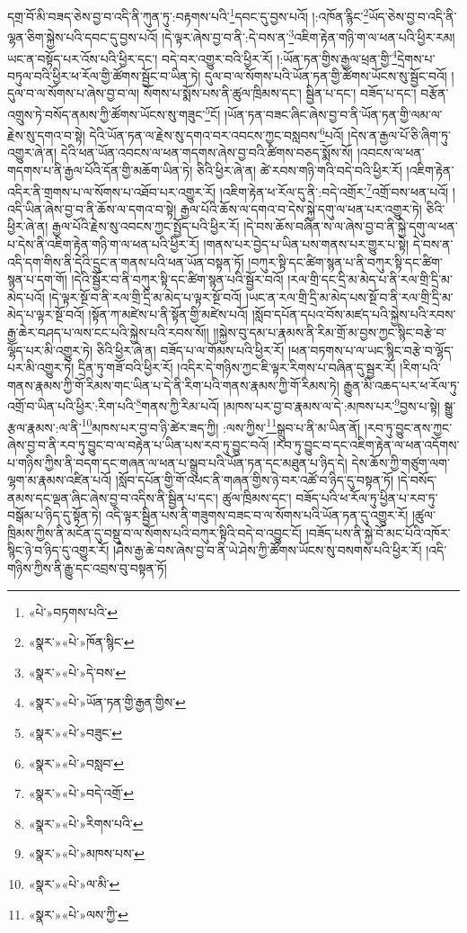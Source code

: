 དགྲ་བོ་མི་བཟད་ཅེས་བྱ་བ་འདི་ནི་ཀུན་ཏུ་:བརྟགས་པའི་\footnote{«པེ་»བཏགས་པའི་}དབང་དུ་བྱས་པའོ། །:འཁོན་རྙིང་\footnote{«སྣར་»«པེ་»ཁོན་སྙིང་}ཡོད་ཅེས་བྱ་བ་འདི་ནི་ལྷན་ཅིག་སྐྱེས་པའི་དབང་དུ་བྱས་པའོ། །དེ་ལྟར་ཞེས་བྱ་བ་ནི་:དེ་བས་ན་\footnote{«སྣར་»«པེ་»དེ་བས་}འཇིག་རྟེན་གཉི་ག་ལ་ཕན་པའི་ཕྱིར་རམ། ཡང་ན་བསྟོད་པར་འོས་པའི་ཕྱིར་དང་། བདེ་བར་འགྱུར་བའི་ཕྱིར་རོ། །:ཡོན་ཏན་གྱིས་རྒྱལ་ཕྲན་གྱི་\footnote{«སྣར་»«པེ་»ཡོན་ཏན་གྱི་རྒྱན་གྱིས་}དྲེགས་པ་བཏུལ་བའི་ཕྱིར་ཕ་རོལ་གྱི་ཚོགས་སྦྱོང་བ་ཡིན་ཏེ། དུལ་བ་ལ་སོགས་པའི་ཡོན་ཏན་གྱི་ཚོགས་ཡོངས་སུ་སྦྱོང་བའོ། །དུལ་བ་ལ་སོགས་པ་ཞེས་བྱ་བ་ལ། སོགས་པ་སྨོས་པས་ནི་ཚུལ་ཁྲིམས་དང་། སྦྱིན་པ་དང་། བཟོད་པ་དང་། བརྩོན་འགྲུས་ཏེ་བསོད་ནམས་ཀྱི་ཚོགས་ཡོངས་སུ་གཟུང་\footnote{«སྣར་»«པེ་»བཟུང་}ངོ། །ཡོན་ཏན་བཟང་ཞིང་ཞེས་བྱ་བ་ནི་ཡོན་ཏན་གྱི་ལམ་ལ་རྗེས་སུ་དགའ་བ་སྟེ། དེའི་ཡོན་ཏན་ལ་རྗེས་སུ་དགའ་བར་འབངས་ཀྱང་བསླབས་\footnote{«སྣར་»«པེ་»བསླབ་}པའོ། །དེས་ན་རྒྱལ་པོ་ཅི་ཞིག་ཏུ་འགྱུར་ཞེ་ན། དེའི་ཕན་ཡོན་འབངས་ལ་ཕན་གདགས་ཞེས་བྱ་བའི་ཚིགས་བཅད་སྨོས་སོ། །འབངས་ལ་ཕན་གདགས་པ་ནི་རྒྱལ་པོའི་དོན་གྱི་མཆོག་ཡིན་ཏེ། ཅིའི་ཕྱིར་ཞེ་ན། ཚེ་རབས་གཉི་གའི་བདེ་བའི་ཕྱིར་རོ། །འཇིག་རྟེན་འདིར་ནི་གྲགས་པ་ལ་སོགས་པ་འཐོབ་པར་འགྱུར་རོ། །འཇིག་རྟེན་ཕ་རོལ་དུ་ནི་:བདེ་འགྲོར་\footnote{«སྣར་»«པེ་»བདེ་འགྲོ་}འགྲོ་བས་ཕན་པའོ། །འདི་ཡིན་ཞེས་བྱ་བ་ནི་ཆོས་ལ་དགའ་བ་སྟེ། རྒྱལ་པོའི་ཆོས་ལ་དགའ་བ་དེས་སྐྱེ་དགུ་ལ་ཕན་པར་འགྱུར་ཏེ། ཅིའི་ཕྱིར་ཞེ་ན། རྒྱལ་པོའི་རྗེས་སུ་འབངས་ཀྱང་སྤྱོད་པའི་ཕྱིར་རོ། །དེ་བས་ཆོས་བཞིན་ས་ལ་ཞེས་བྱ་བ་ནི་སྐྱེ་དགུ་ལ་ཕན་པ་དེས་ནི་འཇིག་རྟེན་གཉི་ག་ལ་ཕན་པའི་ཕྱིར་རོ། །གནས་པར་བྱེད་པ་ཡིན་པས་གནས་པར་གྱུར་པ་སྟེ། དེ་བས་ན་འདི་དག་གིས་ནི་དེའི་དྲུང་ན་གནས་པའི་ཕན་ཡོན་བསྟན་ཏོ། །བཀུར་སྟི་དང་ཚིག་སྙན་པ་ནི་བཀུར་སྟི་དང་ཚིག་སྙན་པ་དག་གོ། །དེའི་སྦྱོར་བ་ནི་བཀུར་སྟི་དང་ཚིག་སྙན་པའི་སྦྱོར་བའོ། །རལ་གྲི་དང་དྲི་མ་མེད་པ་ནི་རལ་གྲི་དྲི་མ་མེད་པའོ། །དེ་ལྟར་སྔོ་བ་ནི་རལ་གྲི་དྲི་མ་མེད་པ་ལྟར་སྔོ་བའོ། །ཡང་ན་རལ་གྲི་དྲི་མ་མེད་པས་སྔོ་བ་ནི་རལ་གྲི་དྲི་མ་མེད་པ་ལྟར་སྔོ་བའོ། །སྟོན་ཀ་མཛེས་པ་ནི་སྟོན་གྱི་མཛེས་པའོ། །སློབ་དཔོན་དཔའ་བོས་མཛད་པའི་སྐྱེས་པའི་རབས་རྒྱ་ཆེར་བཤད་པ་ལས་ངང་པའི་སྐྱེས་པའི་རབས་སོ།། །།སྐྱེས་བུ་དམ་པ་རྣམས་ནི་རིམ་གྲོ་མ་བྱས་ཀྱང་སྙིང་བརྩེ་བ་ལྷོད་པར་མི་འགྱུར་ཏེ། ཅིའི་ཕྱིར་ཞེ་ན། བཟོད་པ་ལ་གོམས་པའི་ཕྱིར་རོ། །ཕན་བཏགས་པ་ལ་ཡང་སྙིང་བརྩེ་བ་ལྷོད་པར་མི་འགྱུར་ཏེ། དྲིན་ཏུ་གཟོ་བའི་ཕྱིར་རོ། །འདིར་དེ་གཉིས་ཀྱང་ཇི་ལྟར་རིགས་པ་བཞིན་དུ་སྦྱར་རོ། །རིག་པའི་གནས་རྣམས་ཀྱི་གོ་རིམས་གང་ཡིན་པ་དེ་ནི་རིག་པའི་གནས་རྣམས་ཀྱི་གོ་རིམས་ཏེ། རྒྱུན་མི་འཆད་པར་ཕ་རོལ་ཏུ་འགྲོ་བ་ཡིན་པའི་ཕྱིར་:རིག་པའི་\footnote{«སྣར་»«པེ་»རིགས་པའི་}གནས་ཀྱི་རིམ་པའོ། །མཁས་པར་བྱ་བ་རྣམས་ལ་དེ་:མཁས་པར་\footnote{«སྣར་»«པེ་»མཁས་པས་}བྱས་པ་སྟེ། སྒྱུ་རྩལ་རྣམས་:ལ་ནི་\footnote{«སྣར་»«པེ་»ལ་མི་}མཁས་པར་བྱ་བ་ཉི་ཚེར་ཟད་ཀྱི། :ལས་ཀྱིས་\footnote{«སྣར་»«པེ་»ལས་ཀྱི་}སྒྲུབ་པ་ནི་མ་ཡིན་ནོ། །རབ་ཏུ་བྱུང་ནས་ཀྱང་ཞེས་བྱ་བ་ནི་རབ་ཏུ་བྱུང་བ་ལ་བརྟེན་པ་ཡིན་པས་རབ་ཏུ་བྱུང་བའོ། །རབ་ཏུ་བྱུང་བ་དང་འཇིག་རྟེན་ལ་ཕན་འདོགས་པ་གཉིས་ཀྱིས་ནི་བདག་དང་གཞན་ལ་ཕན་པ་སྒྲུབ་པའི་ཡོན་ཏན་དང་མཐུན་པ་ཉིད་དེ། དེས་ཆོས་ཀྱི་གཙུག་ལག་ལྷག་མ་རྣམས་འཛིན་པའོ། །སློབ་དཔོན་གྱི་གོ་འཕང་ནི་གཞན་གྱིས་ཉེ་བར་འཚོ་བ་ཉིད་དུ་བསྟན་ཏོ། །དེ་བསོད་ནམས་དང་ལྡན་ཞིང་ཞེས་བྱ་བ་འདིས་ནི་སྦྱིན་པ་དང་། ཚུལ་ཁྲིམས་དང་། བཟོད་པའི་ཕ་རོལ་ཏུ་ཕྱིན་པ་རབ་ཏུ་བསྒོམ་པ་ཉིད་དུ་སྟོན་ཏེ། འདི་ལྟར་སྦྱིན་པས་ནི་གཟུགས་བཟང་བ་ལ་སོགས་པའི་ཡོན་ཏན་དུ་འགྱུར་རོ། །ཚུལ་ཁྲིམས་ཀྱིས་ནི་མངོན་དུ་བསྡུ་བ་ལ་སོགས་པའི་བཀུར་སྟིའི་བདེ་བ་འབྱུང་ངོ། །བཟོད་པས་ནི་སྐྱེ་བོ་མང་པོའི་འཁོར་སྙིང་ཉེ་བ་ཉིད་དུ་འགྱུར་རོ། །ཤེས་རྒྱ་ཆེ་བས་ཞེས་བྱ་བ་ནི་ཡེ་ཤེས་ཀྱི་ཚོགས་ཡོངས་སུ་བསགས་པའི་ཕྱིར་རོ། །འདི་གཉིས་ཀྱིས་ནི་རྒྱུ་དང་འབྲས་བུ་བསྟན་ཏོ། 